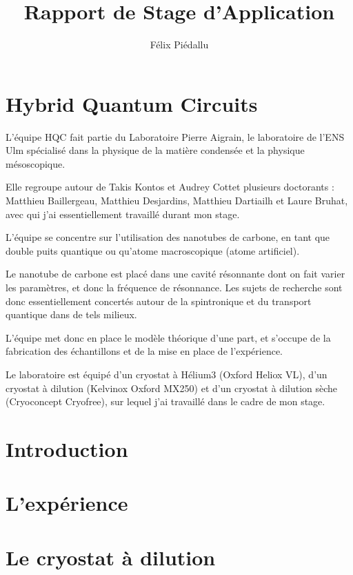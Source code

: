 \documentclass[a4paper,12pt]{report}
\date{}
\title{Rapport de Stage d'Application}
\author{Félix Piédallu}
\begin{document}
\nocite{*}




\chapter*{Hybrid Quantum Circuits}
L'équipe HQC fait partie du Laboratoire Pierre Aigrain, le laboratoire de l'ENS Ulm spécialisé dans la physique de la matière condensée et la physique mésoscopique.

Elle regroupe autour de Takis Kontos et Audrey Cottet plusieurs doctorants : Matthieu Baillergeau, Matthieu Desjardins, Matthieu Dartiailh et Laure Bruhat, avec qui j'ai essentiellement travaillé durant mon stage.\newline

L'équipe se concentre sur l'utilisation des nanotubes de carbone, en tant que double puits quantique ou qu'atome macroscopique (atome artificiel).

Le nanotube de carbone est placé dans une cavité résonnante dont on fait varier les paramètres, et donc la fréquence de résonnance. Les sujets de recherche sont donc essentiellement concertés autour de la spintronique et du transport quantique dans de tels milieux.

L'équipe met donc en place le modèle théorique d'une part, et s'occupe de la fabrication des échantillons et de la mise en place de l'expérience.\newline

Le laboratoire est équipé d'un cryostat à Hélium3 (Oxford Heliox VL), d'un cryostat à dilution (Kelvinox Oxford MX250) et d'un cryostat à dilution sèche (Cryoconcept Cryofree), sur lequel j'ai travaillé dans le cadre de mon stage.





\chapter*{Introduction} %


\chapter{L'expérience}


\chapter{Le cryostat à dilution}

\end{document}
